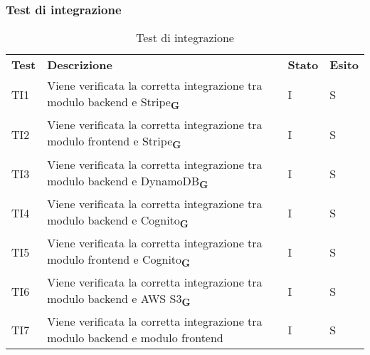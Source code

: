 \subsubsection{Test di integrazione}
\begin{center}
    \centering
    \renewcommand{\arraystretch}{1.8}
    \label{tab:TestIntegrazione}
    \begin{longtable}[!h]{p{45px} p{255px} p{35px} p{35px}}
        \caption{Test di integrazione}                                                                                                                      \\
        \rowcolor{logo!70}
        \textbf{Test} & \textbf{Descrizione}                                                                              & \textbf{Stato} & \textbf{Esito} \\
        TI1           & Viene verificata la corretta integrazione tra modulo backend e Stripe\textsubscript{\textbf{G}}   & I              & S              \\
        TI2           & Viene verificata la corretta integrazione tra modulo frontend e Stripe\textsubscript{\textbf{G}}  & I              & S              \\
        TI3           & Viene verificata la corretta integrazione tra modulo backend e DynamoDB\textsubscript{\textbf{G}} & I              & S              \\
        TI4           & Viene verificata la corretta integrazione tra modulo backend e Cognito\textsubscript{\textbf{G}}  & I              & S              \\
        TI5           & Viene verificata la corretta integrazione tra modulo frontend e Cognito\textsubscript{\textbf{G}} & I              & S              \\
        TI6           & Viene verificata la corretta integrazione tra modulo backend e AWS S3\textsubscript{\textbf{G}}   & I              & S              \\
        TI7           & Viene verificata la corretta integrazione tra modulo backend e modulo frontend                    & I              & S              \\
    \end{longtable}
\end{center}
\pagebreak

